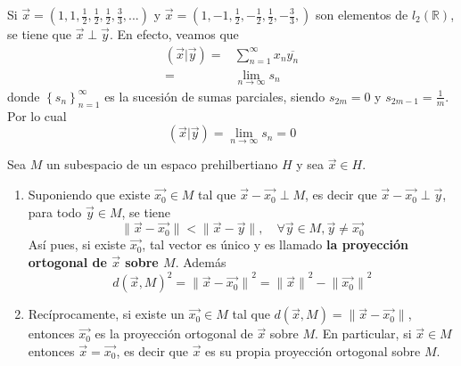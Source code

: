 \documentclass[12pt]{report}
\theoremstyle{largebreak}
\newcommand\norm[1]{\ensuremath{\|#1\|}}
\newcommand\pint[2]{\ensuremath{\left(#1\big| #2\right)}}
\newcommand\conj[1]{\ensuremath{\overline{#1}}}
\begin{document}
    \begin{exa}
        Si $\vec{x}=(1,1,\frac{1}{2},\frac{1}{2},\frac{1}{2},\frac{3}{3},...)$ y $\vec{x}=(1,-1,\frac{1}{2},-\frac{1}{2},\frac{1}{2},-\frac{3}{3},)$ son elementos de $l_2(\mathbb{R})$, se tiene que $\vec{x}\perp\vec{y}$. En efecto, veamos que
        \begin{equation*}
            \begin{split}
                \pint{\vec{x}}{\vec{y}}=&\sum_{n=1}^{\infty}x_n\conj{y_n}\\
                =&\lim_{n\rightarrow\infty}s_n
            \end{split}
        \end{equation*}
        donde $\left\{s_n\right\}_{n=1}^\infty$ es la sucesión de sumas parciales, siendo $s_{2m}=0$ y $s_{2m-1}=\frac{1}{m}$. Por lo cual
        \begin{equation*}
            \pint{\vec{x}}{\vec{y}}=\lim_{n\rightarrow\infty}s_n=0
        \end{equation*}
    \end{exa}

    \begin{theor}
        Sea $M$ un subespacio de un espaco prehilbertiano $H$ y sea $\vec{x}\in H$.
        \begin{enumerate}
            \item Suponiendo que existe $\vec{x_0}\in M$ tal que $\vec{x}-\vec{x_0}\perp M$, es decir que $\vec{x}-\vec{x_0}\perp\vec{y}$, para todo $\vec{y}\in M$, se tiene
            \begin{equation*}
                \norm{\vec{x}-\vec{x_0}}<\norm{\vec{x}-\vec{y}},\quad\forall\vec{y}\in M,\vec{y}\neq\vec{x_0}
            \end{equation*}
            Así pues, si existe $\vec{x_0}$, tal vector es único y es llamado \textbf{la proyección ortogonal de $\vec{x}$ sobre $M$}. Además
            \begin{equation*}
                d(\vec{x},M)^2=\norm{\vec{x}-\vec{x_0}}^2=\norm{\vec{x}}^2-\norm{\vec{x_0}}^2
            \end{equation*}
            \item Recíprocamente, si existe un $\vec{x_0}\in M$ tal que $d(\vec{x},M)=\norm{\vec{x}-\vec{x_0}}$, entonces $\vec{x_0}$ es la proyección ortogonal de $\vec{x}$ sobre $M$. En particular, si $\vec{x}\in M$ entonces $\vec{x}=\vec{x_0}$, es decir que $\vec{x}$ es su propia proyección ortogonal sobre $M$.
        \end{enumerate}
    \end{theor}
\end{document}
